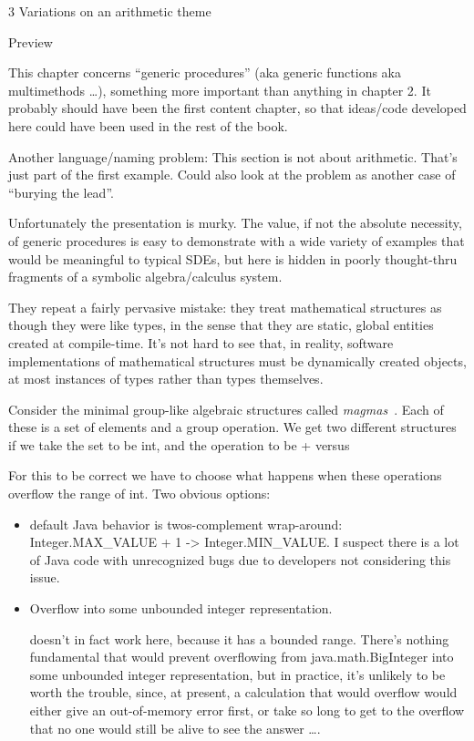 \documentclass[12pt]{PalisadesLakesBook}
\begin{document}
\begin{plSection}{3 Variations on an arithmetic theme}
\begin{plSection}{Preview}

This chapter concerns ``generic procedures''
(aka generic functions aka multimethods {\ldots}),
something more important than anything in chapter 2.
It probably should have been the first content chapter,
so that ideas/code developed here could have been used 
in the rest of the book.

Another language/naming problem:
This section is not about arithmetic.
That's just part of the first example.
Could also look at the problem as another case of 
``burying the lead''.

Unfortunately the presentation is murky.
The value, if not the absolute necessity, of generic procedures
is easy to demonstrate with a wide variety of examples
that would be meaningful to typical SDEs,
but here is hidden in poorly thought-thru fragments of a symbolic
algebra/calculus system.

They repeat a fairly pervasive mistake: they treat mathematical
structures as though they were like types, in the sense that they
are static, global entities created at compile-time.
It's not hard to see that, in reality, software implementations
of mathematical structures must be dynamically created
objects, at most instances of types rather than types themselves.

Consider the minimal group-like algebraic structures 
called \emph{magmas}~\cite{wiki:Magma}.
Each of these is a set of elements and a group operation.
We get two different structures
if we take the set to be {\javaFont int},
and the operation to be {\javaFont +} versus {\javaFont *}

\NOTE For this to be correct we have to choose what happens 
when these operations overflow the range of {\javaFont int}.
Two obvious options:
\begin{itemize}
  \item default Java behavior is twos-complement wrap-around: 
  {\javaFont Integer.MAX\_VALUE + 1 -> Integer.MIN\_VALUE}.
I suspect there is a lot of Java code with unrecognized bugs due
to developers not considering this issue.
\item Overflow into some unbounded integer representation.

 doesn't in fact work here,
because it has a bounded range. 
There's nothing fundamental that would prevent overflowing
from {\javaFont java.math.BigInteger}
into some unbounded integer representation,
but in practice, it's unlikely to be worth the trouble,
since, at present, a calculation that would overflow
would either give an out-of-memory error first,
or take so long to get to the overflow that no one would still be 
alive to see the answer {\ldots}.
  

\end{itemize}
\end{plSection}
\end{plSection}
\end{document}
